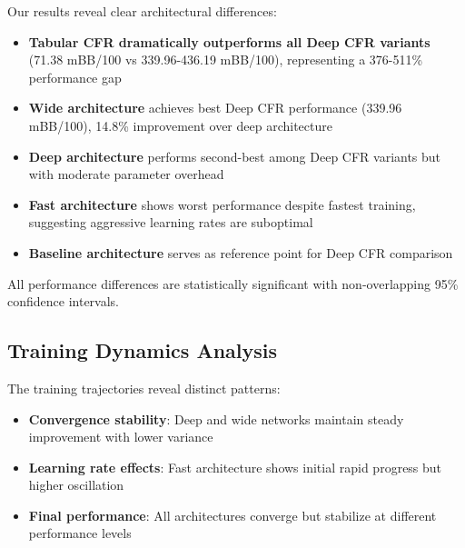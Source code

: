 \documentclass{article}
\begin{document}
Our results reveal clear architectural differences:

\begin{itemize}
\item \textbf{Tabular CFR dramatically outperforms all Deep CFR variants} (71.38 mBB/100 vs 339.96-436.19 mBB/100), representing a 376-511\% performance gap
\item \textbf{Wide architecture} achieves best Deep CFR performance (339.96 mBB/100), 14.8\% improvement over deep architecture
\item \textbf{Deep architecture} performs second-best among Deep CFR variants but with moderate parameter overhead
\item \textbf{Fast architecture} shows worst performance despite fastest training, suggesting aggressive learning rates are suboptimal
\item \textbf{Baseline architecture} serves as reference point for Deep CFR comparison
\end{itemize}

All performance differences are statistically significant with non-overlapping 95\% confidence intervals.

\subsection{Training Dynamics Analysis}


The training trajectories reveal distinct patterns:

\begin{itemize}
\item \textbf{Convergence stability}: Deep and wide networks maintain steady improvement with lower variance
\item \textbf{Learning rate effects}: Fast architecture shows initial rapid progress but higher oscillation
\item \textbf{Final performance}: All architectures converge but stabilize at different performance levels
\end{itemize}
\end{document}
